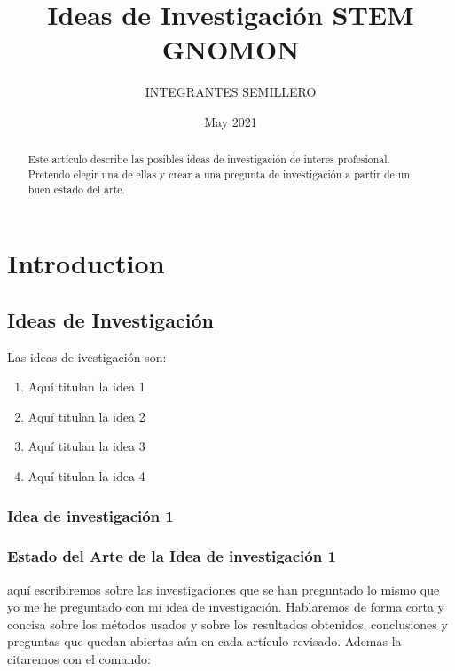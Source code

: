 \documentclass{article}
\title{Ideas de Investigación STEM GNOMON}
\author{INTEGRANTES SEMILLERO}
\date{May 2021}
\begin{document}
\maketitle

\begin{abstract}
        Este artículo describe las posibles ideas de investigación de interes profesional. Pretendo elegir una de ellas y crear a una pregunta de investigación a partir de un buen estado del arte. 
\end{abstract}

\tableofcontents


\section{Introduction}
\subsection{Ideas de Investigación}


Las ideas de ivestigación son:
        \begin{enumerate} 
            \item{Aquí titulan la idea 1}
            \item{Aquí titulan la idea 2}
            \item{Aquí titulan la idea 3}
            \item{Aquí titulan la idea 4}
        \end{enumerate}
        
        
\subsubsection{Idea de investigación 1}%

\subsubsection{Estado del Arte de la Idea de investigación 1} aquí escribiremos sobre las investigaciones que se han preguntado lo mismo que yo me he preguntado con mi idea de investigación. Hablaremos de forma corta y concisa sobre los métodos usados y sobre los resultados obtenidos, conclusiones y preguntas que quedan abiertas aún en cada artículo revisado. Ademas la citaremos con el comando: \cite{ctan} 
\cite{knuth-acp}
\cite{dirac}
\end{document}
